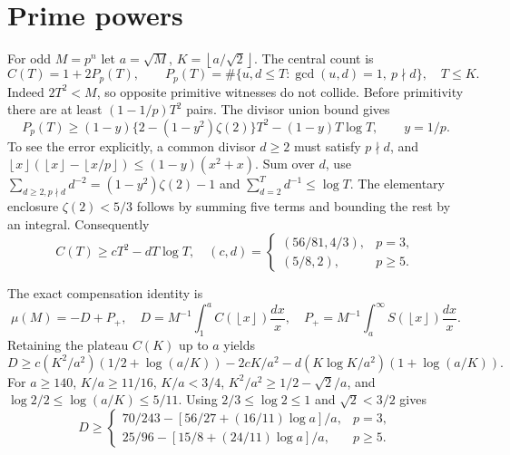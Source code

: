 \documentclass[11pt]{article}
\theoremstyle{definition}\newtheorem{definition}[theorem]{Definition}
\theoremstyle{remark}\newtheorem{remark}[theorem]{Remark}
\newcommand{\floor}[1]{\left\lfloor #1\right\rfloor}
\begin{document}
\section{Prime powers}\label{sec:prime}
For odd \(M=p^n\) let \(a=\sqrt M\), \(K=\floor{a/\sqrt2}\).
The central count is
\[
 C(T)=1+2P_p(T),\qquad
 P_p(T)=\#\{u,d\le T:\gcd(u,d)=1,\ p\nmid d\},\quad T\le K.
\]
Indeed \(2T^2<M\), so opposite primitive witnesses do not collide.
Before primitivity there are at least \((1-1/p)T^2\) pairs.
The divisor union bound gives
\[
 P_p(T)\ge(1-y)\{2-(1-y^2)\zeta(2)\}T^2
            -(1-y)T\log T,\qquad y=1/p.
\]
To see the error explicitly, a common divisor \(d\ge2\) must satisfy
\(p\nmid d\), and
\(\floor{x}(\floor{x}-\floor{x/p})\le(1-y)(x^2+x)\).
Sum over \(d\), use
\(\sum_{d\ge2,p\nmid d}d^{-2}=(1-y^2)\zeta(2)-1\)
and \(\sum_{d=2}^T d^{-1}\le\log T\).
The elementary enclosure \(\zeta(2)<5/3\) follows by summing five terms
and bounding the rest by an integral. Consequently
\[
 C(T)\ge cT^2-dT\log T,\quad
 (c,d)=
 \begin{cases}(56/81,4/3),&p=3,\\(5/8,2),&p\ge5.\end{cases}              \tag{4.1}
\]

The exact compensation identity is
\[
 \mu(M)=-D+P_+,\quad
 D=M^{-1}\int_1^a C(\floor x)\frac{dx}{x},\quad
 P_+=M^{-1}\int_a^\infty S(\floor x)\frac{dx}{x}.     \tag{4.2}\label{eq:comp}
\]
Retaining the plateau \(C(K)\) up to \(a\) yields
\[
 D\ge c(K^2/a^2)(1/2+\log(a/K))
      -2cK/a^2-d(K\log K/a^2)(1+\log(a/K)).          \tag{4.3}
\]
For \(a\ge140\), \(K/a\ge11/16\), \(K/a<3/4\),
\(K^2/a^2\ge1/2-\sqrt2/a\), and
\(\log2/2\le\log(a/K)\le5/11\).
Using \(2/3\le\log2\le1\) and \(\sqrt2<3/2\) gives
\[
 D\ge
 \begin{cases}
 70/243-[56/27+(16/11)\log a]/a,&p=3,\\
 25/96-[15/8+(24/11)\log a]/a,&p\ge5.
 \end{cases}                                      \tag{4.4}
\]
\end{document}
